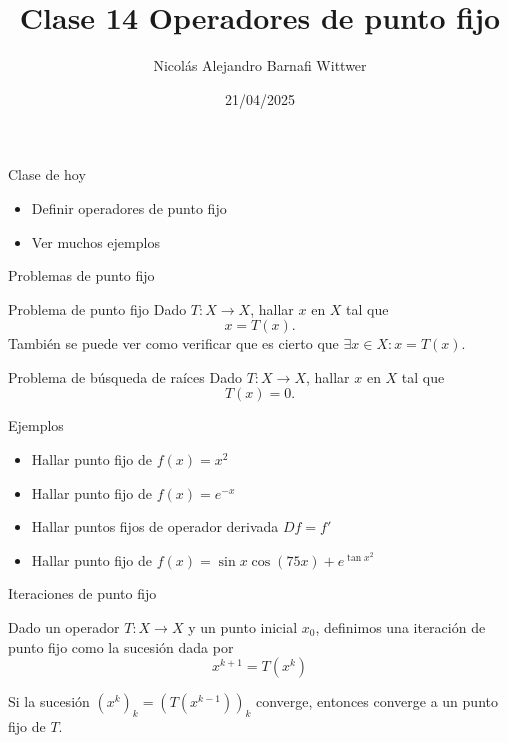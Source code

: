 \documentclass[12pt,aspectratio=169,xcolor=dvipsnames]{beamer}
\title[short title]{Clase 14 Operadores de punto fijo}
\subtitle{}
\author[NA Barnafi] {Nicolás Alejandro Barnafi Wittwer}
\institute[UC|CMM] 
{
    Pontificia Universidad Católica de Chile \\
    Centro de Modelamiento Matemático
}
\date{21/04/2025}
\begin{document}
\begin{frame}
    \maketitle
\end{frame}
\begin{frame}{Clase de hoy}
    \begin{itemize}
        \item Definir operadores de punto fijo
        \item Ver muchos ejemplos
    \end{itemize}
\end{frame}
\begin{frame}{Problemas de punto fijo}
    \begin{block}{Problema de punto fijo}
        Dado $T:X\to X$, hallar $x$ en $X$ tal que
            $$ x = T(x).$$
        También se puede ver como verificar que es cierto que $\exists x\in X: x=T(x)$.
    \end{block}

    \pause \begin{block}{Problema de búsqueda de raíces}
        Dado $T:X\to X$, hallar $x$ en $X$ tal que
            $$ T(x)=0.$$
    \end{block}
\end{frame}
\begin{frame}{Ejemplos}
    \begin{itemize}
        \item<+-> Hallar punto fijo de $f(x) = x^2$
        \item<+-> Hallar punto fijo de $f(x) = e^{-x}$
        \item<+-> Hallar puntos fijos de operador derivada $D f= f'$
        \item<+-> Hallar punto fijo de $f(x) = \sin x \cos (75 x) + e^{\tan x^2}$
    \end{itemize}
    \pause {}
\end{frame}
\begin{frame}{Iteraciones de punto fijo}
    \begin{block}{}
        Dado un operador $T:X\to X$ y un punto inicial $x_0$, definimos una iteración de punto fijo como la sucesión dada por
            $$ x^{k+1} = T(x^k)$$
    \end{block}
    Si la sucesión $(x^k)_k = (T(x^{k-1}))_k$ converge, entonces converge a un punto fijo de $T$.

    \pause {}
\end{frame}
\end{document}
